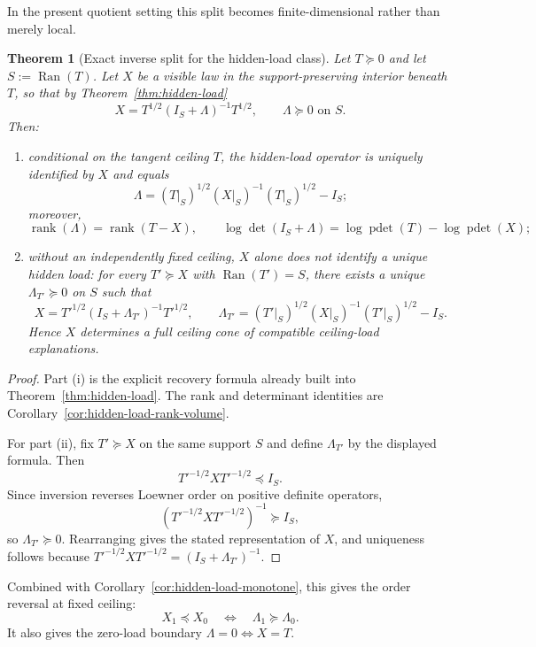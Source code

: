 \documentclass[11pt]{article}
\numberwithin{equation}{section}
\DeclareMathOperator{\rank}{rank}
\DeclareMathOperator{\pdet}{pdet}
\theoremstyle{thmcompact}
\newtheorem{theorem}{Theorem}[section]
\theoremstyle{remark}
\begin{document}
In the present quotient setting this split becomes finite-dimensional rather than merely local.

\begin{theorem}[Exact inverse split for the hidden-load class]\label{thm:bridge-hidden-load-split}
Let $T\succeq0$ and let $S:=\operatorname{Ran}(T)$. Let $X$ be a visible law in the support-preserving interior beneath $T$, so that by Theorem~\ref{thm:hidden-load}
\[
X=T^{1/2}(I_S+\Lambda)^{-1}T^{1/2},\qquad \Lambda\succeq0\text{ on }S.
\]
Then:
\begin{enumerate}[label=\textup{(\roman*)},leftmargin=2.4em]
\item conditional on the tangent ceiling $T$, the hidden-load operator is uniquely identified by $X$ and equals
\begin{equation}\label{eq:bridge-load-recovery}
\Lambda=(T|_S)^{1/2}(X|_S)^{-1}(T|_S)^{1/2}-I_S;
\end{equation}
moreover,
\[
\rank(\Lambda)=\rank(T-X),
\qquad
\log\det(I_S+\Lambda)=\log\pdet(T)-\log\pdet(X);
\]
\item without an independently fixed ceiling, $X$ alone does not identify a unique hidden load: for every $T'\succeq X$ with $\operatorname{Ran}(T')=S$, there exists a unique $\Lambda_{T'}\succeq0$ on $S$ such that
\[
X=T'^{1/2}(I_S+\Lambda_{T'})^{-1}T'^{1/2},
\qquad
\Lambda_{T'}=(T'|_S)^{1/2}(X|_S)^{-1}(T'|_S)^{1/2}-I_S.
\]
Hence $X$ determines a full ceiling cone of compatible ceiling-load explanations.
\end{enumerate}
\end{theorem}

\begin{proof}
Part \textup{(i)} is the explicit recovery formula already built into Theorem~\ref{thm:hidden-load}. The rank and determinant identities are Corollary~\ref{cor:hidden-load-rank-volume}.

For part \textup{(ii)}, fix $T'\succeq X$ on the same support $S$ and define $\Lambda_{T'}$ by the displayed formula. Then
\[
T'^{-1/2}XT'^{-1/2}\preceq I_S.
\]
Since inversion reverses Loewner order on positive definite operators,
\[
(T'^{-1/2}XT'^{-1/2})^{-1}\succeq I_S,
\]
so $\Lambda_{T'}\succeq0$. Rearranging gives the stated representation of $X$, and uniqueness follows because $T'^{-1/2}XT'^{-1/2}=(I_S+\Lambda_{T'})^{-1}$.
\end{proof}

Combined with Corollary~\ref{cor:hidden-load-monotone}, this gives the order reversal at fixed ceiling:
\[
X_1\preceq X_0
\quad\Longleftrightarrow\quad
\Lambda_1\succeq\Lambda_0.
\]
It also gives the zero-load boundary $\Lambda=0\Longleftrightarrow X=T$.
\end{document}
